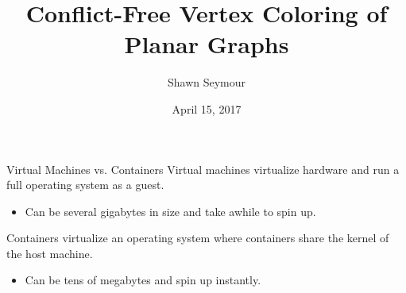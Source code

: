 \documentclass[xcolor=dvipsnames,aspectratio=1610]{beamer}
\title{Conflict-Free Vertex Coloring of Planar Graphs}
\date{April 15, 2017}
\author{Shawn Seymour}
\begin{document}
  \maketitle
  \begin{frame}{Virtual Machines vs. Containers}
      \alert{Virtual machines} virtualize hardware and run a full operating system as a guest.
      \begin{itemize}
          \item Can be several gigabytes in size and take awhile to spin up.
      \end{itemize}
      \vspace{10px}

      \alert{Containers} virtualize an operating system where containers share the kernel of the host machine.
      \begin{itemize}
          \item Can be tens of megabytes and spin up instantly.
      \end{itemize}

  \end{frame}
\end{document}
